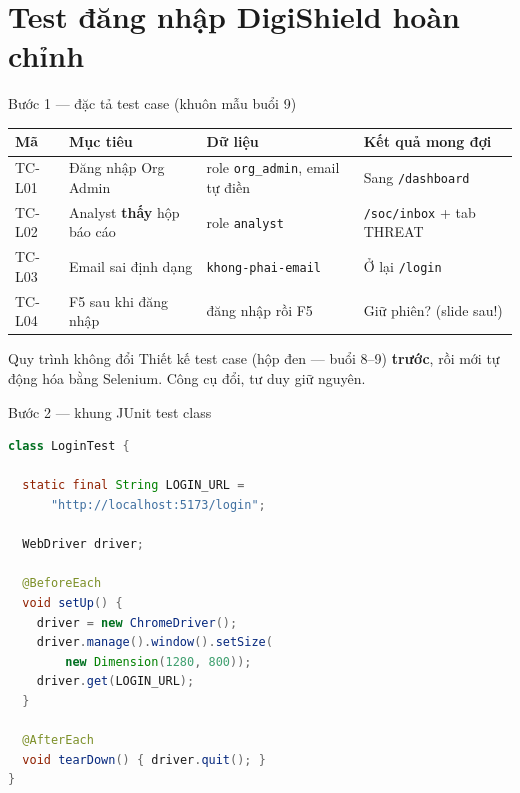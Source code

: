 \documentclass[aspectratio=169,12pt]{beamer}
\begin{document}
\section{Test đăng nhập DigiShield hoàn chỉnh}

\begin{frame}{Bước 1 --- đặc tả test case (khuôn mẫu buổi 9)}
  \begin{center}
  \small
  \setlength{\tabcolsep}{4pt}
  \begin{tabular}{p{1.5cm}p{3.3cm}p{4.5cm}p{3.4cm}}
    \toprule
    \textbf{Mã} & \textbf{Mục tiêu} & \textbf{Dữ liệu} & \textbf{Kết quả mong đợi} \\
    \midrule
    TC-L01 & Đăng nhập Org Admin & role \texttt{org\_admin}, email tự điền & Sang \texttt{/dashboard} \\
    TC-L02 & Analyst \textbf{thấy} hộp báo cáo & role \texttt{analyst} & \texttt{/soc/inbox} + tab THREAT \\
    TC-L03 & Email sai định dạng & \texttt{khong-phai-email} & Ở lại \texttt{/login} \\
    TC-L04 & F5 sau khi đăng nhập & đăng nhập rồi F5 & Giữ phiên? (slide sau!) \\
    \bottomrule
  \end{tabular}
  \end{center}

  \begin{block}{Quy trình không đổi}
    Thiết kế test case (hộp đen --- buổi 8--9) \textbf{trước},
    rồi mới tự động hóa bằng Selenium. Công cụ đổi, tư duy giữ nguyên.
  \end{block}
\end{frame}

\begin{frame}[fragile]{Bước 2 --- khung JUnit test class}
\begin{lstlisting}[language=java,basicstyle=\ttfamily\scriptsize]
class LoginTest {

  static final String LOGIN_URL =
      "http://localhost:5173/login";

  WebDriver driver;

  @BeforeEach
  void setUp() {
    driver = new ChromeDriver();
    driver.manage().window().setSize(
        new Dimension(1280, 800));
    driver.get(LOGIN_URL);
  }

  @AfterEach
  void tearDown() { driver.quit(); }
}
\end{lstlisting}
\end{frame}
\end{document}
